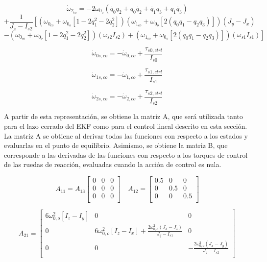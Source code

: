 \[
\dot{\omega}_{2_{co}} = -2\omega_{0_{o}} \left(\dot{q_0} q_2 +  q_0 \dot{q_2} + \dot{q_1} q_3 +  q_1 \dot{q_3} \right) 
\]
\[
+ \frac{1}{J_z - I_{s2}} \left[ \left( \omega_{0_{co}} + \omega_{0_{o}} \left[1-2q_1^2-2q_2^2 \right] \right) 
\left( \omega_{1_{co}} + \omega_{0_{o}} \left[ 2(q_0 q_1 - q_2 q_3) \right] \right) (J_y - J_x) \right.
\]
\[
\left. - \left( \omega_{0_{co}} + \omega_{0_{o}} \left[ 1-2q_1^2-2q_2^2 \right] \right) (\omega_{s2} I_{s2}) 
+ \left( \omega_{1_{co}} + \omega_{0_{o}} \left[ 2(q_0 q_1 - q_2 q_3) \right] \right) (\omega_{s1} I_{s1}) \right]
\]

\[
	\dot{\omega}_{0s,co} = -\dot{\omega}_{0,co} + \frac{\tau_{s0,ctrl}}{I_{s0}}
\]

\[
	\dot{\omega}_{1s,co} = -\dot{\omega}_{1,co} + \frac{\tau_{s1,ctrl}}{I_{s1}}
\]

\[
	\dot{\omega}_{2s,co} = -\dot{\omega}_{2,co} + \frac{\tau_{s2,ctrl}}{I_{s2}}
\]

A partir de esta representación, se obtiene la matriz A, que será utilizada tanto para el lazo cerrado del \gls{EKF} como para el control lineal descrito en esta sección. La matriz A se obtiene al derivar todas las funciones con respecto a los estados y evaluarlas en el punto de equilibrio. Asimismo, se obtiene la matriz B, que corresponde a las derivadas de las funciones con respecto a los torques de control de las ruedas de reacción, evaluadas cuando la acción de control es nula.


\[
A_{11} = A_{13}
\begin{bmatrix}
	0 & 0 & 0 \\
	0 & 0 & 0 \\
	0 & 0 & 0 \\
\end{bmatrix} \quad
A_{12} = 
\begin{bmatrix}
	0.5 & 0 & 0 \\
	0 & 0.5 & 0 \\
	0 & 0 & 0.5 \\
\end{bmatrix}
\]

\[
A_{21} = 
\begin{bmatrix}
	6 \omega_{0,o}^2 \left[I_z - I_y\right]  & 0 & 0 \\
	0 & 6 \omega_{0,o}^2 \left[I_z - I_x\right] + \frac{2 \omega_{0,o}^2 \left(J_x - J_z\right)}{J_y - I_{s1}}
	& 0 \\
	0 & 0 &  -\frac{2 \omega_{0,o}^2 \left(J_x - J_y\right)}{J_z - I_{s2}}
	\\
\end{bmatrix}
\]

